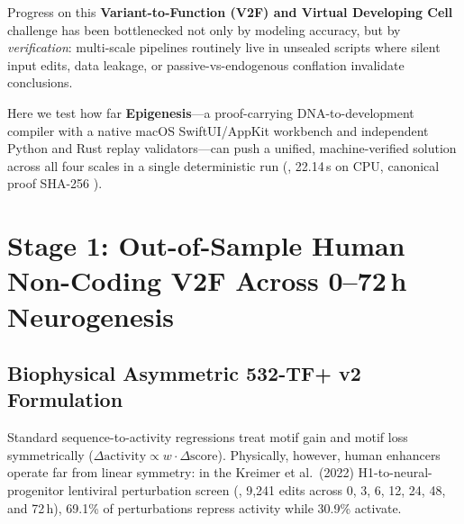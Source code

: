 \documentclass[10.5pt,a4paper]{article}
\begin{document}
Progress on this \textbf{Variant-to-Function (V2F) and Virtual Developing Cell} challenge has been bottlenecked not only by modeling accuracy, but by \emph{verification}: multi-scale pipelines routinely live in unsealed scripts where silent input edits, data leakage, or passive-vs-endogenous conflation invalidate conclusions.

Here we test how far \textbf{Epigenesis}—a proof-carrying DNA-to-development compiler with a native macOS SwiftUI/AppKit workbench and independent Python and Rust replay validators—can push a unified, machine-verified solution across all four scales in a single deterministic run (, 22.14\,s on CPU, canonical proof SHA-256 ).

\section{Stage 1: Out-of-Sample Human Non-Coding V2F Across 0--72\,h Neurogenesis}

\subsection{Biophysical Asymmetric 532-TF+ v2 Formulation}

Standard sequence-to-activity regressions treat motif gain and motif loss symmetrically ($\Delta\text{activity} \propto w \cdot \Delta\text{score}$). Physically, however, human enhancers operate far from linear symmetry: in the Kreimer et al.\ (2022) H1-to-neural-progenitor lentiviral perturbation screen (, 9,241 edits across 0, 3, 6, 12, 24, 48, and 72\,h), 69.1\% of perturbations repress activity while 30.9\% activate.
\end{document}
